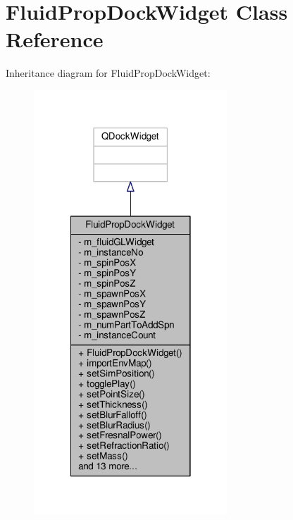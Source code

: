 \hypertarget{class_fluid_prop_dock_widget}{\section{Fluid\-Prop\-Dock\-Widget Class Reference}
\label{class_fluid_prop_dock_widget}
}


Inheritance diagram for Fluid\-Prop\-Dock\-Widget\-:\nopagebreak
\begin{figure}[H]
\begin{center}
\leavevmode
\includegraphics[width=206pt]{class_fluid_prop_dock_widget__inherit__graph}
\end{center}
\end{figure}


